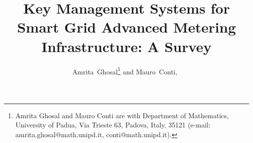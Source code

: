 %
%






\documentclass[journal]{IEEEtran}

\usepackage{bibentry}  
\usepackage{xcolor,soul,framed, balance} %

\usepackage[pdftex]{graphicx}
\graphicspath{{../pdf/}{../jpeg/}}
\usepackage{dingbat}
\usepackage[cmex10]{amsmath}
\usepackage{array}
\usepackage{mdwmath}
\usepackage{mdwtab}
\usepackage{eqparbox}
\usepackage{url}
\usepackage{siunitx}
\usepackage{booktabs}
\usepackage{pifont}%
\newcommand{\cmark}{\ding{53}}%
\hyphenation{}
\usepackage{multirow}
\usepackage{amsmath}
\usepackage{mathtools}
\usepackage{breqn}
\usepackage{graphicx}
\usepackage{array}
\usepackage{setspace} 



    \title{Key Management Systems for Smart Grid Advanced Metering Infrastructure: A Survey}
 \author{Amrita~Ghosal\thanks{Amrita Ghosal and Mauro Conti are with Department of Mathematics, University of Padua, Via Trieste 63, Padova, Italy, 35121 (e-mail: amrita.ghosal@math.unipd.it, conti@math.unipd.it).} and 
        Mauro~Conti,~}%

 
%
%
  



